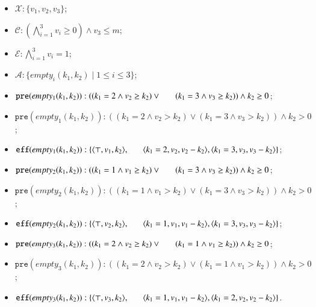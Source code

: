 \documentclass[review]{elsarticle}
\newcommand{\set}[1]{\{ #1 \}}
\newcommand{\tuple}[1]{\langle {#1} \rangle}
\newcommand{\true}{\top}
\newcommand{\statevar}{\mathcal{X}}
\newcommand{\act}{\mathcal{A}}
\newcommand{\constraint}{\mathcal{C}}
\newcommand{\estate}{\mathcal{E}}
\newcommand{\pre}{\mathtt{pre}}
\newcommand{\eff}{\mathtt{eff}}
\begin{document}
\begin{itemize}
	\item $\statevar: \set{v_1, v_2, v_3}$;
	\item $\constraint: (\bigwedge_{i=1}^{3} v_i \ge 0) \wedge v_3 \le m$;
	\item $\estate: \bigwedge_{i=1}^{3} v_i = 1$;
	\item $\act:\set{empty_i(k_1, k_2)\mid 1\le i\le 3}$;
	\item $\pre(empty_1(k_1, k_2)) : ((k_1 =2 \wedge v_2 \ge k_2) \vee\\
	\hspace*{6mm}(k_1=3 \wedge v_3 \ge k_2)) \wedge k_2\ge 0$;
	\item {\color{red}$\pre(empty_1(k_1, k_2)) : ((k_1 = 2 \wedge v_2 > k_2) \vee (k_1 = 3 \wedge v_3 > k_2)) \wedge k_2 > 0$;}
	\item $\eff(empty_1(k_1, k_2)) : \set{\tuple{\true, v_1, k_2}, \\
		\hspace*{6mm}\tuple{k_1=2, v_2, v_2 - k_2}, \tuple{k_1=3, v_3, v_3 - k_2}}$;
	\item $\pre(empty_2(k_1, k_2)) : ((k_1 =1 \wedge v_1 \ge k_2) \vee\\
	\hspace*{6mm}(k_1=3 \wedge v_3 \ge k_2)) \wedge k_2\ge 0$;
	\item {\color{red}$\pre(empty_2(k_1, k_2)) : ((k_1 = 1 \wedge v_1 > k_2) \vee (k_1 = 3 \wedge v_3 > k_2)) \wedge k_2 > 0$;}
	\item $\eff(empty_2(k_1, k_2)) : \set{\tuple{\true, v_2, k_2}, \\
		\hspace*{6mm} \tuple{k_1=1, v_1, v_1 - k_2}, \tuple{k_1=3, v_3, v_3 - k_2}}$;
	\item $\pre(empty_3(k_1, k_2)) : ((k_1 =2 \wedge v_2 \ge k_2) \vee \\
	\hspace*{6mm}(k_1=1 \wedge v_1 \ge k_2)) \wedge k_2\ge 0$;
	\item {\color{red}$\pre(empty_3(k_1, k_2)) : ((k_1 = 2 \wedge v_2 > k_2) \vee (k_1 = 1 \wedge v_1 > k_2)) \wedge k_2 > 0$;}
	\item $\eff(empty_3(k_1, k_2)) : \set{\tuple{\true, v_3, k_2},\\
		\hspace*{6mm}\tuple{k_1=1, v_1, v_1 - k_2}, \tuple{k_1=2, v_2, v_2 - k_2}}$.
\end{itemize}
\end{document}
